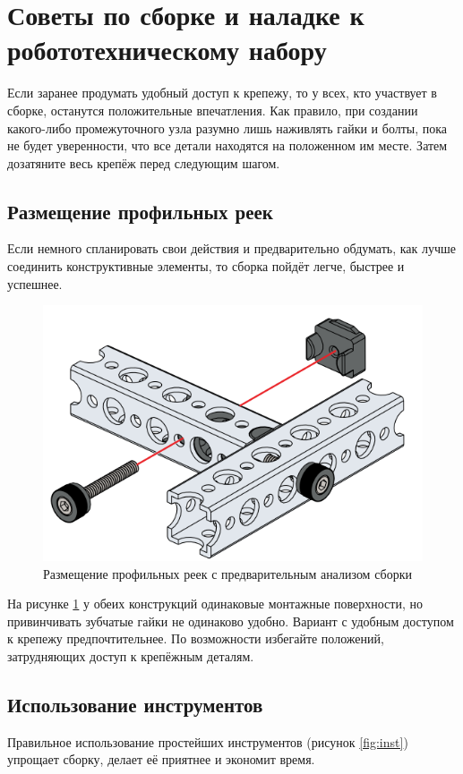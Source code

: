 \section{Советы по сборке и наладке к робототехническому набору}
Если заранее продумать удобный доступ к крепежу, то у всех, кто участвует в сборке, останутся положительные впечатления.
Как правило, при создании какого-либо промежуточного узла разумно лишь наживлять гайки и болты, пока не будет уверенности,
что все детали находятся на положенном им месте. Затем дозатяните весь крепёж перед следующим шагом.\cite{3}

\subsection{Размещение профильных реек}
Если немного спланировать свои действия и предварительно обдумать, как лучше соединить конструктивные элементы, то сборка
пойдёт легче, быстрее и успешнее.\cite{1}

\begin{figure}[h]
    \centering
    \includegraphics[scale=0.4]{fig/2.2.png}
    \caption{Размещение профильных реек с предварительным анализом сборки}
    \label{fig:razm}
\end{figure}

На рисунке \ref{fig:razm} у обеих конструкций одинаковые монтажные поверхности, но привинчивать зубчатые гайки не одинаково
удобно. Вариант с удобным доступом к крепежу предпочтительнее. По возможности избегайте положений, затрудняющих
доступ к крепёжным деталям.

\subsection{Использование инструментов}
Правильное использование простейших инструментов (рисунок \ref{fig:inst}) упрощает сборку, делает её приятнее и экономит время.

